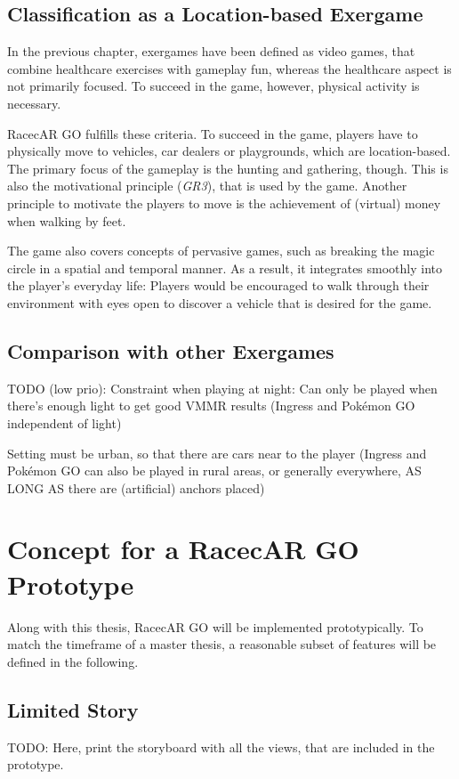 \subsection{Classification as a Location-based Exergame}
In the previous chapter, exergames have been defined as video games, that combine healthcare exercises with gameplay fun, whereas the healthcare aspect is not primarily focused. To succeed in the game, however, physical activity is necessary.

RacecAR GO fulfills these criteria. To succeed in the game, players have to physically move to vehicles, car dealers or playgrounds, which are location-based. The primary focus of the gameplay is the hunting and gathering, though. This is also the motivational principle (\emph{GR3}), that is used by the game. Another principle to motivate the players to move is the achievement of (virtual) money when walking by feet.

The game also covers concepts of pervasive games, such as breaking the magic circle in a spatial and temporal manner. As a result, it integrates smoothly into the player's everyday life: Players would be encouraged to walk through their environment with eyes open to discover a vehicle that is desired for the game.

\subsection{Comparison with other Exergames}
TODO (low prio):
Constraint when playing at night: Can only be played when there's enough light to get good VMMR results (Ingress and Pok\'{e}mon GO independent of light)

Setting must be urban, so that there are cars near to the player (Ingress and Pok\'{e}mon GO can also be played in rural areas, or generally everywhere, AS LONG AS there are (artificial) anchors placed)


\section{Concept for a RacecAR GO Prototype}
Along with this thesis, RacecAR GO will be implemented prototypically. To match the timeframe of a master thesis, a reasonable subset of features will be defined in the following.

\subsection{Limited Story}
TODO: Here, print the storyboard with all the views, that are included in the prototype.

